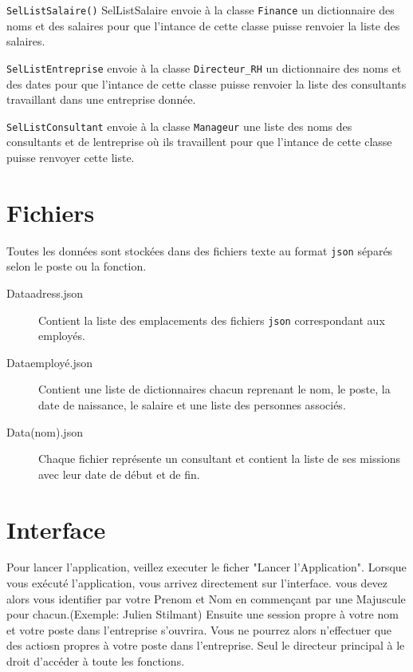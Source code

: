 \documentclass[a4paper, 11pt]{article}
\begin{document}
\texttt{SelListSalaire()} SelListSalaire envoie à la classe \texttt{Finance} un dictionnaire des noms et des salaires pour que l'intance de cette classe puisse renvoier la liste des salaires.

\texttt{SelListEntreprise} envoie à la classe \verb|Directeur_RH| un dictionnaire des noms et des dates pour que l'intance de cette classe puisse renvoier la liste des consultants travaillant dans une entreprise donnée.

\texttt{SelListConsultant} envoie à la classe \texttt{Manageur} une liste des noms des consultants et de lentreprise où ils travaillent pour que l'intance de cette classe puisse renvoyer cette liste.

\section{Fichiers}
Toutes les données sont stockées dans des fichiers texte au format \texttt{json} séparés selon le poste ou la fonction.

\begin{description}
  \item[Dataadress.json] Contient la liste des emplacements des fichiers \texttt{json} correspondant aux employés.
  \item[Dataemployé.json] Contient une liste de dictionnaires chacun reprenant le nom, le poste, la date de naissance, le salaire et une liste des personnes associés.
  \item[Data(nom).json] Chaque fichier représente un consultant et contient la liste de ses missions avec leur date de début et de fin.
\end{description}

\section{Interface}
Pour lancer l'application, veillez executer le ficher "Lancer l'Application".
Lorsque vous exécuté l'application, vous arrivez directement sur l'interface. vous devez alors vous identifier par votre Prenom et Nom en commençant par une Majuscule pour chacun.(Exemple: Julien Stilmant)
Ensuite une session propre à votre nom et votre poste dans l'entreprise s'ouvrira. Vous ne pourrez alors n'effectuer que des actiosn propres à votre poste dans l'entreprise. Seul le directeur principal à le droit d'accéder à toute les fonctions.
\end{document}
